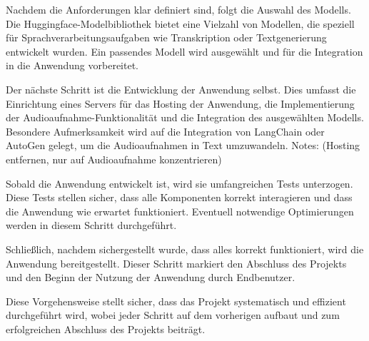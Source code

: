 \documentclass[12pt,a4paper,parskip=full]{scrartcl}
\begin{document}
Nachdem die Anforderungen klar definiert sind, folgt die Auswahl des Modells.
Die Huggingface-Modelbibliothek bietet eine Vielzahl von Modellen, die speziell für Sprachverarbeitungsaufgaben wie Transkription oder Textgenerierung entwickelt wurden. \cite{huggingface_hugging_nodate}
Ein passendes Modell wird ausgewählt und für die Integration in die Anwendung vorbereitet.

Der nächste Schritt ist die Entwicklung der Anwendung selbst. Dies umfasst die Einrichtung eines Servers für das Hosting der Anwendung, die Implementierung der Audioaufnahme-Funktionalität und die Integration des ausgewählten Modells. Besondere Aufmerksamkeit wird auf die Integration von LangChain \cite{langchain_agents_nodate} oder AutoGen \cite{microsoft_getting_nodate} gelegt, um die Audioaufnahmen in Text umzuwandeln. 
Notes: (Hosting entfernen, nur auf Audioaufnahme konzentrieren)

Sobald die Anwendung entwickelt ist, wird sie umfangreichen Tests unterzogen.
Diese Tests stellen sicher, dass alle Komponenten korrekt interagieren und dass die Anwendung wie erwartet funktioniert. Eventuell notwendige Optimierungen werden in diesem Schritt durchgeführt.

Schließlich, nachdem sichergestellt wurde, dass alles korrekt funktioniert, wird die Anwendung bereitgestellt.
Dieser Schritt markiert den Abschluss des Projekts und den Beginn der Nutzung der Anwendung durch Endbenutzer.

Diese Vorgehensweise stellt sicher, dass das Projekt systematisch und effizient durchgeführt wird, wobei jeder Schritt auf dem vorherigen aufbaut und zum erfolgreichen Abschluss des Projekts beiträgt.



\printbibliography
\end{document}

